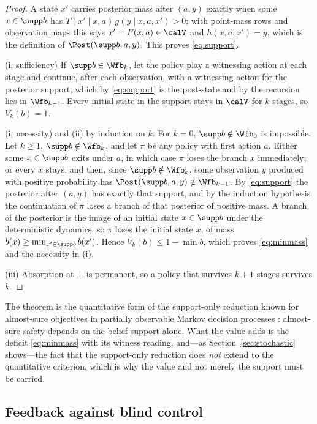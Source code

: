 \begin{proof}
A state $x'$ carries posterior mass after $(a,y)$ exactly when some $x\in\supp b$ has $T(x'\mid x,a)\,g(y\mid x,a,x')>0$; with point-mass rows and observation maps this says $x'=F(x,a)\in\calV$ and $h(x,a,x')=y$, which is the definition of $\Post(\supp b,a,y)$. This proves \eqref{eq:support}.

(i, sufficiency) If $\supp b\in\Wfb_k$, let the policy play a witnessing action at each stage and continue, after each observation, with a witnessing action for the posterior support, which by \eqref{eq:support} is the post-state and by the recursion lies in $\Wfb_{k-1}$. Every initial state in the support stays in $\calV$ for $k$ stages, so $V_k(b)=1$.

(i, necessity) and (ii) by induction on $k$. For $k=0$, $\supp b\notin\Wfb_0$ is impossible. Let $k\ge1$, $\supp b\notin\Wfb_k$, and let $\pi$ be any policy with first action $a$. Either some $x\in\supp b$ exits under $a$, in which case $\pi$ loses the branch $x$ immediately; or every $x$ stays, and then, since $\supp b\notin\Wfb_k$, some observation $y$ produced with positive probability has $\Post(\supp b,a,y)\notin\Wfb_{k-1}$. By \eqref{eq:support} the posterior after $(a,y)$ has exactly that support, and by the induction hypothesis the continuation of $\pi$ loses a branch of that posterior of positive mass. A branch of the posterior is the image of an initial state $x\in\supp b$ under the deterministic dynamics, so $\pi$ loses the initial state $x$, of mass $b(x)\ge\min_{x'\in\supp b}b(x')$. Hence $V_k(b)\le1-\min b$, which proves \eqref{eq:minmass} and the necessity in (i).

(iii) Absorption at $\bot$ is permanent, so a policy that survives $k+1$ stages survives $k$.
\end{proof}

The theorem is the quantitative form of the support-only reduction known for almost-sure objectives in partially observable Markov decision processes \cite{Chatterjee2010,Chatterjee2016}: almost-sure safety depends on the belief support alone. What the value adds is the deficit \eqref{eq:minmass} with its witness reading, and---as Section~\ref{sec:stochastic} shows---the fact that the support-only reduction does \emph{not} extend to the quantitative criterion, which is why the value and not merely the support must be carried.

\subsection{Feedback against blind control}

